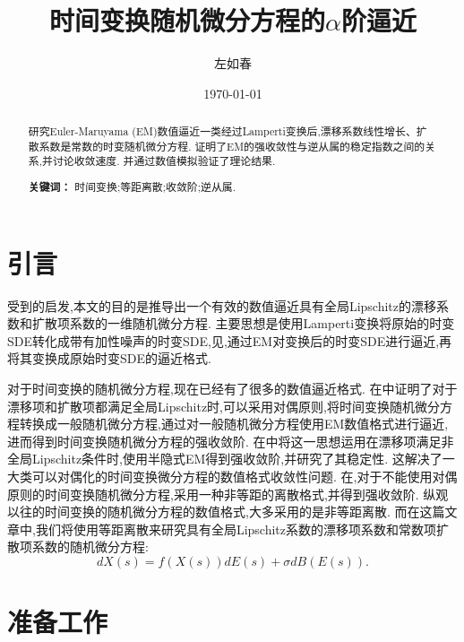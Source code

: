 \documentclass[12pt,final]{article}
\title{时间变换随机微分方程的$\alpha$阶逼近}
\author{左如春}
\date{\today}
\numberwithin{equation}{section}
\numberwithin{figure}{section}
\numberwithin{table}{section}
\theoremstyle{plain}
\theoremstyle{Definition}
\theoremstyle{Remark}
\begin{document}
	
	\maketitle
	
	\begin{abstract}
		研究Euler-Maruyama (EM)数值逼近一类经过Lamperti变换后,漂移系数线性增长、扩散系数是常数的时变随机微分方程. 证明了EM的强收敛性与逆从属的稳定指数之间的关系,并讨论收敛速度. 并通过数值模拟验证了理论结果. 
		
		\medskip
		\noindent\textbf{关键词：} 时间变换;等距离散;收敛阶;逆从属. 
	\end{abstract}
	
	\section{引言}
	
	受到\cite{Alfonsi2013602}的启发,本文的目的是推导出一个有效的数值逼近具有全局Lipschitz的漂移系数和扩散项系数的一维随机微分方程. 主要思想是使用Lamperti变换将原始的时变SDE转化成带有加性噪声的时变SDE,见\cite{iacus2008simulation},通过EM对变换后的时变SDE进行逼近,再将其变换成原始时变SDE的逼近格式. 
	
	对于时间变换的随机微分方程,现在已经有了很多的数值逼近格式. 在\cite{jum2014strong}中证明了对于漂移项和扩散项都满足全局Lipschitz时,可以采用对偶原则,将时间变换随机微分方程转换成一般随机微分方程,通过对一般随机微分方程使用EM数值格式进行逼近,进而得到时间变换随机微分方程的强收敛阶. 在\cite{deng2020semi}中将这一思想运用在漂移项满足非全局Lipschitz条件时,使用半隐式EM得到强收敛阶,并研究了其稳定性. 这解决了一大类可以对偶化的时间变换微分方程的数值格式收敛性问题. 在\cite{jin2019strong},对于不能使用对偶原则的时间变换随机微分方程,采用一种非等距的离散格式,并得到强收敛阶. 纵观以往的时间变换的随机微分方程的数值格式,大多采用的是非等距离散. 而在这篇文章中,我们将使用等距离散来研究具有全局Lipschitz系数的漂移项系数和常数项扩散项系数的随机微分方程:
	\begin{equation}\label{basic SDE}
		dX(s)=f(X(s))dE(s)+\sigma dB(E(s)). 
	\end{equation}
	
	\section{准备工作}
	
\end{document}
